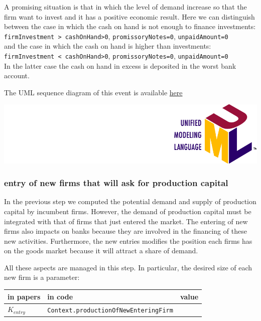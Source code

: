 \documentclass{book}
\newcommand{\umllocation}{file:///Users/giulioni/Dropbox/svn/sfcabm_my/documentation}
\begin{document}
A promising situation is that in which the level of demand increase so that the firm want to invest and it has a positive economic result. Here we can distinguish between the case in which the cash on hand is not enough to finance investments:\\  
\verb+firmInvestment > cashOnHand>0+, \verb+promissoryNotes=0+, \verb+unpaidAmount=0+ \\
and the case in which the cash on hand is higher than investments:\\
\verb+firmInvestment < cashOnHand>0+, \verb+promissoryNotes=0+, \verb+unpaidAmount=0+ \\
In the latter case the cash on hand in excess is deposited in the worst bank account.

\vskip3mm
The UML sequence diagram of this event is available \href{\umllocation/setPossibleInvestment.html}{here}
\begin{marginfigure}
	\includegraphics[scale=0.1]{uml.png}
\end{marginfigure}


\subsubsection{entry of new firms that will ask for production capital}

In the previous step we computed the potential demand and supply of production capital by incumbent firms. However, the demand of production capital must be integrated with that of firms that just entered the market. 
The entering of new firms also impacts on banks because they are involved in the financing of these new activities. Furthermore, the new entries modifies the position each firms has on the goods market because it will attract a share of demand.

All these aspects are managed in this step.
In particular, the desired size of each new firm is a parameter:\\

\vskip3mm
\begin{tabular}{l l l}
	\hline
	in papers& in code&value\\
	\hline
	\hline
	$K_{entry}$&\verb+Context.productionOfNewEnteringFirm+&\\
	\hline
\end{tabular}
\end{document}
